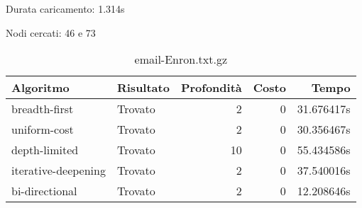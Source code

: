 Durata caricamento: 1.314s

Nodi cercati: 46 e 73

\begin{table}[h]
\centering
\begin{tabular}{|l|l|r|r|r|}
\hline
\textbf{Algoritmo} & \textbf{Risultato} & \textbf{Profondità} & \textbf{Costo} & \textbf{Tempo} \\
 \hline
breadth-first & Trovato & 2 & 0 & 31.676417s \\
uniform-cost & Trovato & 2 & 0 & 30.356467s \\
depth-limited & Trovato & 10 & 0 & 55.434586s \\
iterative-deepening & Trovato & 2 & 0 & 37.540016s \\
bi-directional & Trovato & 2 & 0 & 12.208646s \\
\hline
\end{tabular}
\caption{email-Enron.txt.gz}
\end{table}
